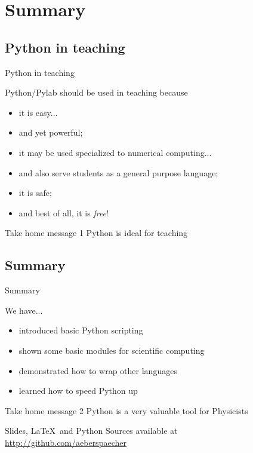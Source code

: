 \section{Summary}

\subsection{Python in teaching}

\begin{frame}{Python in teaching}

Python/Pylab should be used in teaching because

\begin{itemize}
    \item it is easy...
    \item and yet powerful;
    \item it may be used specialized to numerical computing...
    \item and also serve students as a general purpose language;
    \item it is safe;
    \item and best of all, it is \emph{free}!
\end{itemize}

\begin{alertbbox}{Take home message 1}
Python is ideal for teaching
\end{alertbbox}

\end{frame}

\subsection{Summary}

\begin{frame}{Summary}

We have...

\begin{itemize}
    \item introduced basic Python scripting
    \item shown some basic modules for scientific computing
    \item demonstrated how to wrap other languages
    \item learned how to speed Python up
\end{itemize}

\begin{alertbbox}{Take home message 2}
Python is a very valuable tool for Physicists
\end{alertbbox}

Slides, \LaTeX~and Python Sources available at\\
\url{http://github.com/aeberspaecher}

\end{frame}

